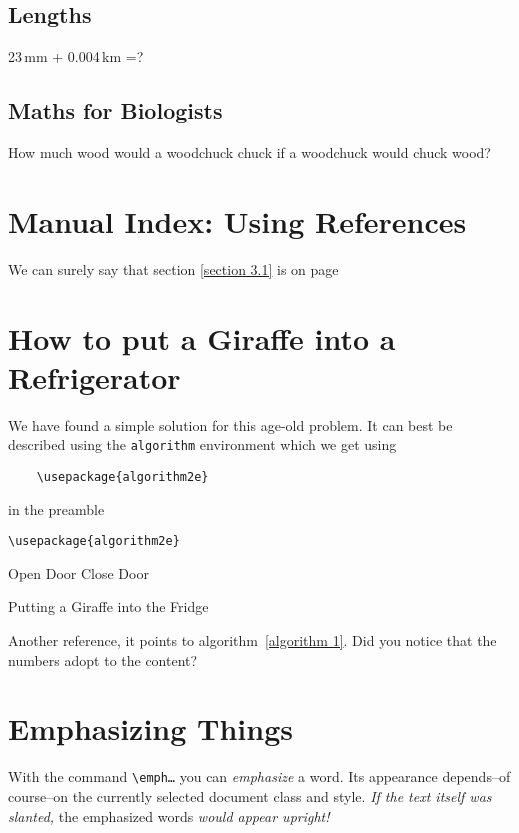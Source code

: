 \documentclass[a4paper, 10pt]{article}
\begin{document}
		
		\subsection{Lengths}
			23\,mm + 0.004\,km =?
		\subsection{Maths for Biologists}
		How much wood would a woodchuck chuck if a woodchuck would chuck wood?
		
	\section{Manual Index: Using References}
	We can surely say that section \ref{section 3.1} is on page \pageref{section 3.1}
	\section{How to put a Giraffe into a Refrigerator}
	We have found a simple solution for this age-old problem. It can best be described using the \texttt{algorithm} environment which we get using
	\begin{verbatim}
	\usepackage{algorithm2e}
	\end{verbatim}
	in the preamble

	\verb|\usepackage{algorithm2e}| 	%
	
	\begin{algorithm}
	Open Door\;
	Close Door\;
	\caption{Putting a Giraffe into the Fridge}
	\label{algorithm 1}
	\end{algorithm}
	
	Another reference, it points to algorithm~\ref{algorithm 1}. Did you notice that the numbers adopt to the content?
	
	\section{Emphasizing Things}
	With the command \texttt{\textbackslash emph{\dots}} you can \emph{emphasize} a word. Its appearance depends--of course--on the currently selected document class and style. \textsl{If the text itself was slanted,} the emphasized words \textsl{would appear upright!}
\end{document}
